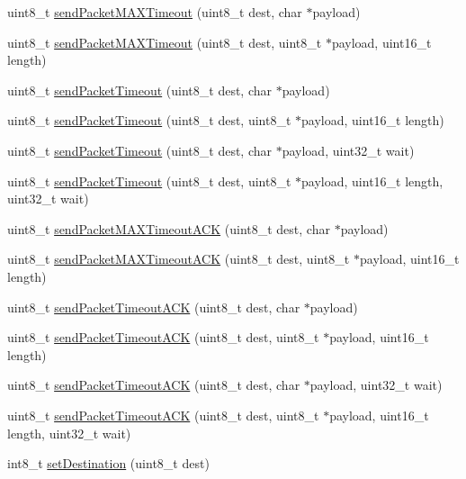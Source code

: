 \begin{DoxyCompactItemize}
uint8\+\_\+t \hyperlink{class_wasp_s_x1272_aade52cbbf70fd42eccf9a6f83c9fed6d}{send\+Packet\+M\+A\+X\+Timeout} (uint8\+\_\+t dest, char $\ast$payload)
\item 
uint8\+\_\+t \hyperlink{class_wasp_s_x1272_abe613448b1c0ad5470297288f2c510e4}{send\+Packet\+M\+A\+X\+Timeout} (uint8\+\_\+t dest, uint8\+\_\+t $\ast$payload, uint16\+\_\+t length)
\item 
uint8\+\_\+t \hyperlink{class_wasp_s_x1272_ad218714f7005cfe6af7867a5102cd66e}{send\+Packet\+Timeout} (uint8\+\_\+t dest, char $\ast$payload)
\item 
uint8\+\_\+t \hyperlink{class_wasp_s_x1272_a454c089cf9ee490098996fc2852516fa}{send\+Packet\+Timeout} (uint8\+\_\+t dest, uint8\+\_\+t $\ast$payload, uint16\+\_\+t length)
\item 
uint8\+\_\+t \hyperlink{class_wasp_s_x1272_a4d67e110f17bb1af67bd3d8c8f171c79}{send\+Packet\+Timeout} (uint8\+\_\+t dest, char $\ast$payload, uint32\+\_\+t wait)
\item 
uint8\+\_\+t \hyperlink{class_wasp_s_x1272_aab5c58b6000c527a958d37cf84a1e6df}{send\+Packet\+Timeout} (uint8\+\_\+t dest, uint8\+\_\+t $\ast$payload, uint16\+\_\+t length, uint32\+\_\+t wait)
\item 
uint8\+\_\+t \hyperlink{class_wasp_s_x1272_a06669a509b7b1e2e8c7dd573495548d4}{send\+Packet\+M\+A\+X\+Timeout\+A\+CK} (uint8\+\_\+t dest, char $\ast$payload)
\item 
uint8\+\_\+t \hyperlink{class_wasp_s_x1272_acc7d19c5f87ada936e98e6d8ec226161}{send\+Packet\+M\+A\+X\+Timeout\+A\+CK} (uint8\+\_\+t dest, uint8\+\_\+t $\ast$payload, uint16\+\_\+t length)
\item 
uint8\+\_\+t \hyperlink{class_wasp_s_x1272_a4918dca6e41512f0be457af884f79aa8}{send\+Packet\+Timeout\+A\+CK} (uint8\+\_\+t dest, char $\ast$payload)
\item 
uint8\+\_\+t \hyperlink{class_wasp_s_x1272_afc7c0f0a4f588b97dec7dd8c89a5d182}{send\+Packet\+Timeout\+A\+CK} (uint8\+\_\+t dest, uint8\+\_\+t $\ast$payload, uint16\+\_\+t length)
\item 
uint8\+\_\+t \hyperlink{class_wasp_s_x1272_a30ea240ddcb8f4d300993ed19b4125d7}{send\+Packet\+Timeout\+A\+CK} (uint8\+\_\+t dest, char $\ast$payload, uint32\+\_\+t wait)
\item 
uint8\+\_\+t \hyperlink{class_wasp_s_x1272_a31db984ec240735f181778be6d76e58b}{send\+Packet\+Timeout\+A\+CK} (uint8\+\_\+t dest, uint8\+\_\+t $\ast$payload, uint16\+\_\+t length, uint32\+\_\+t wait)
\item 
int8\+\_\+t \hyperlink{class_wasp_s_x1272_a1ce9404fd36d521df85aa3012b1f6ce7}{set\+Destination} (uint8\+\_\+t dest)

\end{DoxyCompactItemize}
